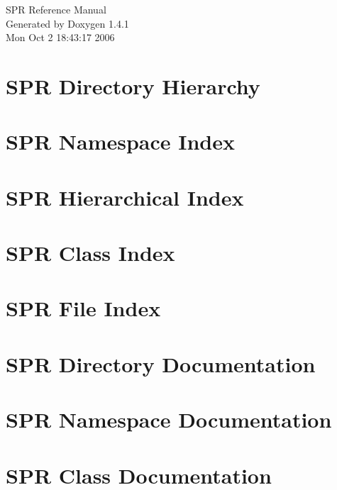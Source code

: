 \documentclass[a4paper]{book}
\begin{document}
\begin{titlepage}
\vspace*{7cm}
\begin{center}
{\Large SPR Reference Manual}\\
\vspace*{1cm}
{\large Generated by Doxygen 1.4.1}\\
\vspace*{0.5cm}
{\small Mon Oct 2 18:43:17 2006}\\
\end{center}
\end{titlepage}
\clearemptydoublepage
{}
\tableofcontents
\clearemptydoublepage
{}
\chapter{SPR Directory Hierarchy}

\chapter{SPR Namespace Index}

\chapter{SPR Hierarchical Index}

\chapter{SPR Class Index}

\chapter{SPR File Index}

\chapter{SPR Directory Documentation}

\chapter{SPR Namespace Documentation}

\chapter{SPR Class Documentation}




























\end{document}
